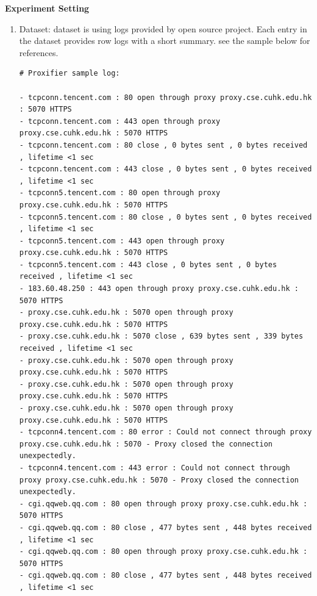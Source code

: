 \documentclass[conference]{IEEEtran}
\begin{document}
\textbf{Experiment Setting}
\begin{enumerate}
    \item Dataset: dataset is using logs provided by open source project\cite{liu2019logzip}. Each entry in the dataset provides row logs with a short summary. see the sample below for references.
    
    \begin{lstlisting}[numbers=none]
# Proxifier sample log:

- tcpconn.tencent.com : 80 open through proxy proxy.cse.cuhk.edu.hk : 5070 HTTPS
- tcpconn.tencent.com : 443 open through proxy proxy.cse.cuhk.edu.hk : 5070 HTTPS
- tcpconn.tencent.com : 80 close , 0 bytes sent , 0 bytes received , lifetime <1 sec
- tcpconn.tencent.com : 443 close , 0 bytes sent , 0 bytes received , lifetime <1 sec
- tcpconn5.tencent.com : 80 open through proxy proxy.cse.cuhk.edu.hk : 5070 HTTPS
- tcpconn5.tencent.com : 80 close , 0 bytes sent , 0 bytes received , lifetime <1 sec
- tcpconn5.tencent.com : 443 open through proxy proxy.cse.cuhk.edu.hk : 5070 HTTPS
- tcpconn5.tencent.com : 443 close , 0 bytes sent , 0 bytes received , lifetime <1 sec
- 183.60.48.250 : 443 open through proxy proxy.cse.cuhk.edu.hk : 5070 HTTPS
- proxy.cse.cuhk.edu.hk : 5070 open through proxy proxy.cse.cuhk.edu.hk : 5070 HTTPS
- proxy.cse.cuhk.edu.hk : 5070 close , 639 bytes sent , 339 bytes received , lifetime <1 sec
- proxy.cse.cuhk.edu.hk : 5070 open through proxy proxy.cse.cuhk.edu.hk : 5070 HTTPS
- proxy.cse.cuhk.edu.hk : 5070 open through proxy proxy.cse.cuhk.edu.hk : 5070 HTTPS
- proxy.cse.cuhk.edu.hk : 5070 open through proxy proxy.cse.cuhk.edu.hk : 5070 HTTPS
- tcpconn4.tencent.com : 80 error : Could not connect through proxy proxy.cse.cuhk.edu.hk : 5070 - Proxy closed the connection unexpectedly.
- tcpconn4.tencent.com : 443 error : Could not connect through proxy proxy.cse.cuhk.edu.hk : 5070 - Proxy closed the connection unexpectedly.
- cgi.qqweb.qq.com : 80 open through proxy proxy.cse.cuhk.edu.hk : 5070 HTTPS
- cgi.qqweb.qq.com : 80 close , 477 bytes sent , 448 bytes received , lifetime <1 sec
- cgi.qqweb.qq.com : 80 open through proxy proxy.cse.cuhk.edu.hk : 5070 HTTPS
- cgi.qqweb.qq.com : 80 close , 477 bytes sent , 448 bytes received , lifetime <1 sec


\end{lstlisting}
\end{enumerate}
\end{document}
